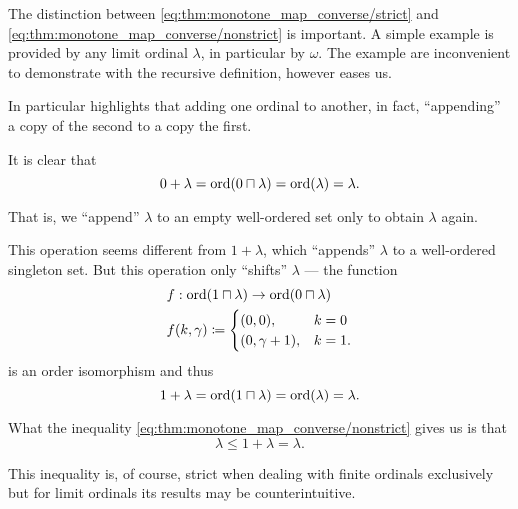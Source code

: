 \begin{example}\label{ex:ordinal_addition}
  The distinction between \eqref{eq:thm:monotone_map_converse/strict} and \eqref{eq:thm:monotone_map_converse/nonstrict} is important. A simple example is provided by any limit ordinal \( \lambda \), in particular by \( \omega \). The example are inconvenient to demonstrate with the recursive definition, however  eases us.

  In particular  highlights that adding one ordinal to another, in fact, \enquote{appending} a copy of the second to a copy the first.

  It is clear that
  \begin{equation*}
    0 + \lambda = \operatorname{ord}(0 \sqcap \lambda) = \operatorname{ord}(\lambda) = \lambda.
  \end{equation*}

  That is, we \enquote{append} \( \lambda \) to an empty well-ordered set only to obtain \( \lambda \) again.

  This operation seems different from \( 1 + \lambda \), which \enquote{appends} \( \lambda \) to a well-ordered singleton set. But this operation only \enquote{shifts} \( \lambda \) --- the function
  \begin{equation*}
    \begin{aligned}
      &f: \operatorname{ord}(1 \sqcap \lambda) \to \operatorname{ord}(0 \sqcap \lambda) \\
      &f(k, \gamma) \coloneqq \begin{cases}
        (0, 0),          &k = 0 \\
        (0, \gamma + 1), &k = 1.
      \end{cases}
    \end{aligned}
  \end{equation*}
  is an order isomorphism and thus
  \begin{equation*}
    1 + \lambda = \operatorname{ord}(1 \sqcap \lambda) = \operatorname{ord}(\lambda) = \lambda.
  \end{equation*}

  What the inequality \eqref{eq:thm:monotone_map_converse/nonstrict} gives us is that
  \begin{equation*}
    \lambda \leq 1 + \lambda = \lambda.
  \end{equation*}

  This inequality is, of course, strict when dealing with finite ordinals exclusively but for limit ordinals its results may be counterintuitive.


\end{example}
